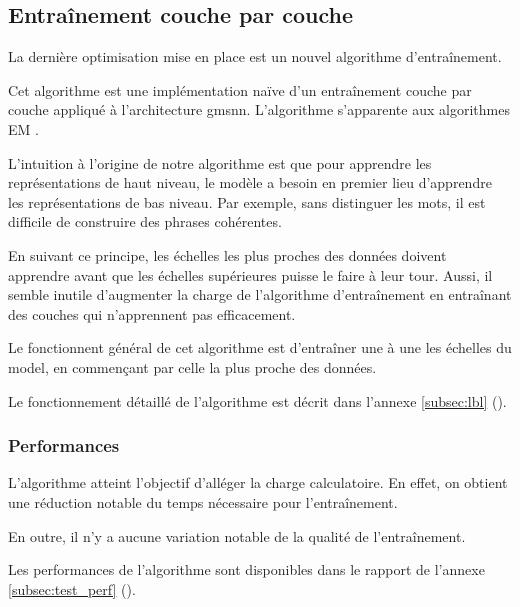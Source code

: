 \subsection{Entraînement couche par couche}\label{subsec:optilbl}
La dernière optimisation mise en place est un nouvel algorithme d'entraînement.

Cet algorithme est une implémentation naïve d'un entraînement couche par couche appliqué à l'architecture \gls{gmsnn}. L'algorithme s'apparente aux algorithmes EM . %

L'intuition à l'origine de notre algorithme est que pour apprendre les représentations de haut niveau, le modèle a besoin en premier lieu d'apprendre les représentations de bas niveau.
Par exemple, sans distinguer les mots, il est difficile de construire des phrases cohérentes.

En suivant ce principe, les échelles les plus proches des données doivent apprendre avant que les échelles supérieures puisse le faire à leur tour.
Aussi, il semble inutile d'augmenter la charge de l'algorithme d'entraînement en entraînant des couches qui n'apprennent pas efficacement.

Le fonctionnent général de cet algorithme est d'entraîner une à une les échelles du \gls{model}, en commençant par celle la plus proche des données.

Le fonctionnement détaillé de l'algorithme est décrit dans l'annexe \ref{subsec:lbl} ().

\subsubsection{Performances}

L'algorithme atteint l'objectif d'alléger la charge calculatoire. En effet, on obtient une réduction notable du temps nécessaire pour l'entraînement.

En outre, il n'y a aucune variation notable de la qualité de l'entraînement.

Les performances de l'algorithme sont disponibles dans le rapport de l'annexe \ref{subsec:test_perf} ().


